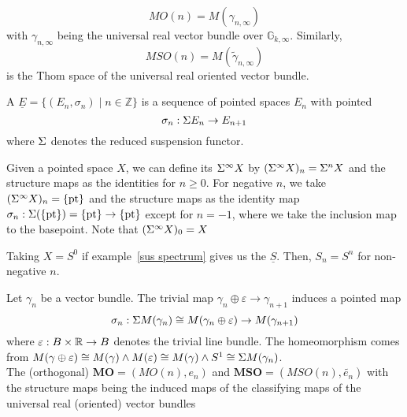 \documentclass[a4paper,12pt]{article}
\begin{document}
\begin{example}
    \[MO(n)=M(\gamma_{n,\infty})\] with \(\gamma_{n,\infty}\) being the universal real vector bundle over \(\mathbb{G}_{k,\infty}\). Similarly,
    \[MSO(n)= M(\tilde\gamma_{n,\infty}) \]
    is the Thom space of the universal real oriented vector bundle.
\end{example}

\begin{definition}
    A  \(\underline E = \{(E_n,\sigma_n)\mid n\in\mathbb{Z}\}\) is a sequence of pointed spaces \(E_n\) with pointed \[\sigma_n:\Sigma E_n\to E_{n+1}\]
    where \(\Sigma\) denotes the reduced suspension functor.
\end{definition}

\begin{example}\label{sus spectrum}
    Given a pointed space \(X\), we can define its  \(\Sigma^\infty X\) by \((\Sigma^\infty X)_n=\Sigma^n X\) and the structure maps as the identities for \(n\geq0\). For negative \(n\), we take \((\Sigma^\infty X)_n=\{\mathrm{pt}\}\) and the structure maps as the identity map \(\sigma_n:\Sigma(\{\mathrm{pt}\})=\{\mathrm{pt}\}\to\{\mathrm{pt}\}\) except for \(n=-1\), where we take the inclusion map to the basepoint.
    Note that \((\Sigma^\infty X)_0=X\)
\end{example}

\begin{example}
    Taking \(X=S^0\) if example\ \ref{sus spectrum} gives us the  \(\underline{S}\). Then, \(S_n=S^n\) for non-negative \(n\).
\end{example}

\begin{example}[Thom spectrum\ {\cite[Beispiel IV.1.2(b)]{brocker}}]
    Let \(\gamma_n\) be a vector bundle. The trivial map \(\gamma_n\oplus\varepsilon\to\gamma_{n+1}\) induces a pointed map
    \[\sigma_n:\Sigma M(\gamma_n)\cong M(\gamma_n\oplus \varepsilon)\to M(\gamma_{n+1})\]
    where \(\varepsilon:B\times\mathbb{R}\to B\) denotes the trivial line bundle. The homeomorphism comes from \(M(\gamma\oplus\varepsilon)\cong M(\gamma)\land M(\varepsilon)\cong M(\gamma)\land S^1\cong \Sigma M(\gamma_n)\).\\
    The (orthogonal)  \(\mathbf{MO}=(MO(n),e_n)\) and \(\mathbf{MSO}=(MSO(n),\widetilde{e_n})\) with the structure maps being the induced maps of the classifying maps of the universal real (oriented) vector bundles
\end{example}
\end{document}
